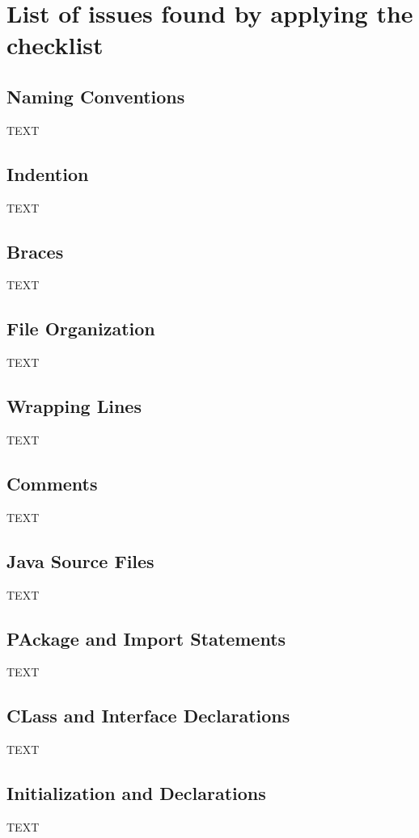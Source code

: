\section{List of issues found by applying the checklist}

\subsection{Naming Conventions}
TEXT

\subsection{Indention}
TEXT

\subsection{Braces}
TEXT

\subsection{File Organization}
TEXT

\subsection{Wrapping Lines}
TEXT

\subsection{Comments}
TEXT

\subsection{Java Source Files}
TEXT

\subsection{PAckage and Import Statements}
TEXT

\subsection{CLass and Interface Declarations}
TEXT

\subsection{Initialization and Declarations}
TEXT

